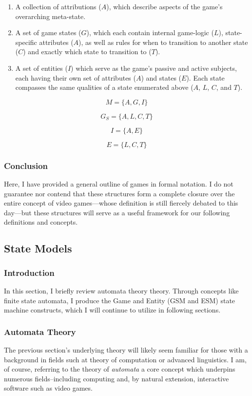 \documentclass{report}
\begin{document}
\begin{enumerate}
    \item A collection of attributions ($A$), which describe aspects of the game's overarching meta-state.
    \item A set of game states ($G$), which each contain internal game-logic ($L$), state-specific attributes ($A$), as well as rules for when to transition to another state ($C$) and exactly which state to transition to ($T$).   
    \item A set of entities ($I$) which serve as the game's passive and active subjects, each having their own set of attributes ($A$) and states ($E$). Each state compasses the same qualities of a state enumerated above ($A$, $L$, $C$, and $T$).   
\end{enumerate}

$$
M = \{A, G, I\}
$$

$$
G_S = \{ A, L, C, T \}
$$

$$I = \{A, E\}$$

$$E = \{L, C, T\}$$


\subsubsection{Conclusion}
Here, I have provided a general outline of games in formal notation. I do not guarantee nor contend that these structures form a complete closure over the entire concept of video games---whose definition is still fiercely debated to this day\cite{Knoop_2021}---but these structures will serve as a useful framework for our following definitions and concepts.

\subsection{State Models}

\subsubsection{Introduction} 
In this section, I briefly review automata theory theory. Through concepts like finite state automata, I produce the Game and Entity (GSM and ESM) state machine constructs, which I will continue to utilize in following sections.

\subsubsection{Automata Theory}
The previous section's underlying theory will likely seem familiar for those with a background in fields such at theory of computation or advanced linguistics. I am, of course, referring to the theory of \emph{automata} a core concept which underpins numerous fields--including computing and, by natural extension, interactive software such as video games. 
\end{document}
